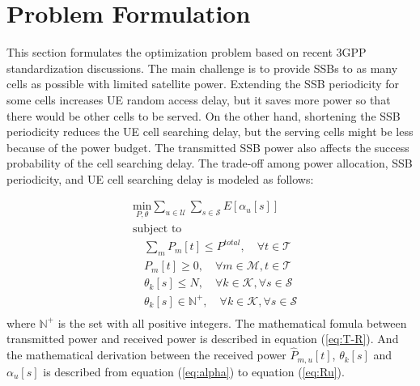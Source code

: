 
\section{Problem Formulation}
This section formulates the optimization problem based on recent 3GPP standardization discussions. The main challenge is to provide SSBs to as many cells as possible with limited satellite power. Extending the SSB periodicity for some cells increases UE random access delay, but it saves more power so that there would be other cells to be served. On the other hand, shortening the SSB periodicity reduces the UE cell searching delay, but the serving cells might be less because of the power budget. The transmitted SSB power also affects the success probability of the cell searching delay. The trade-off among power allocation, SSB periodicity, and UE cell searching delay is modeled as follows:

\begin{equation}
\begin{aligned}
    & \underset{P, \theta}{\text{min}} \sum_{u \in \mathcal{U}} \sum_{s \in \mathcal{S}} E[{\alpha_u[s]}] \\
    & \text{subject to} \\
    & \quad \sum_{m} P_{m}[t] \leq P^{total}, \quad \forall t \in \mathcal{T} \\
    & \quad P_{m}[t] \geq 0, \quad \forall m \in \mathcal{M}, t \in \mathcal{T} \\
    & \quad \theta_k[s] \leq N, \quad \forall k \in \mathcal{K}, \forall s \in \mathcal{S} \\
    & \quad \theta_k[s] \in \mathbb{N}^+, \quad \forall k \in \mathcal{K}, \forall s \in \mathcal{S} \\
\end{aligned}
\end{equation}
where $\mathbb{N}^+$ is the set with all positive integers. The mathematical fomula between transmitted power and received power is described in equation (\ref{eq:T-R}). And the mathematical derivation between the received power $\hat{P}_{m, u}[t]$, $\theta_k[s]$ and $\alpha_u[s]$ is described from equation (\ref{eq:alpha}) to equation (\ref{eq:Ru}). 

